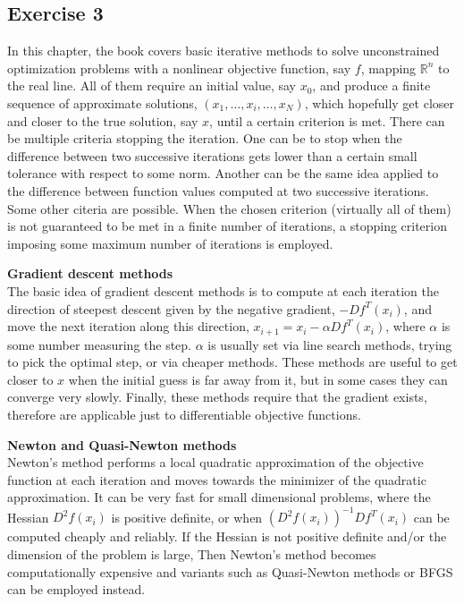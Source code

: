 \documentclass[11.5pt, letterpaper, bibtotoc,
    tablecaptionabove, figurecaptionabove]{article}
\begin{document}
\subsection*{Exercise 3}
In this chapter, the book covers basic iterative methods to solve unconstrained optimization problems 
with a nonlinear objective function, say $f$, mapping $\mathbb R^n$ to the real line.
All of them require an initial value, say $x_0$, and produce a finite sequence of approximate solutions,
$(x_1,\ldots,x_i,\ldots,x_N)$, which hopefully get closer and closer to the true solution, say $x$,
until a certain criterion is met.
There can be multiple criteria stopping the iteration.
One can be to stop when the difference between two successive iterations gets lower than
a certain small tolerance with respect to some norm.
Another can be the same idea applied to the difference between function values
computed at two successive iterations.
Some other citeria are possible. 
When the chosen criterion (virtually all of them) is not guaranteed to be met in a finite number of iterations,
a stopping criterion imposing some maximum number of iterations is employed.

\textbf{Gradient descent methods}\\
The basic idea of gradient descent methods is to compute at each iteration
the direction of steepest descent given by the negative gradient, $-Df^T(x_i)$,
and move the next iteration along this direction, $x_{i+1}=x_i-\alpha Df^T(x_i)$,
where $\alpha$ is some number measuring the step.
$\alpha$ is usually set via line search methods, trying to pick the optimal step,
or via cheaper methods.
These methods are useful to get closer to $x$ when the initial guess is far
away from it, but in some cases they can converge very slowly.
Finally, these methods require that the gradient exists, therefore are applicable just to differentiable objective functions.

\textbf{Newton and Quasi-Newton methods}\\
Newton's method performs a local quadratic approximation of the 
objective function at each iteration and moves towards the minimizer of the quadratic approximation.
It can be very fast for small dimensional problems, where the Hessian $D^2f(x_i)$ 
is positive definite, or when $(D^2f(x_i))^{-1}Df^T(x_i)$ can be computed cheaply and reliably.
If the Hessian is not positive definite and/or the dimension of the problem is large,
Then Newton's method becomes computationally expensive and variants such as
Quasi-Newton methods or BFGS can be employed instead.
\end{document}
